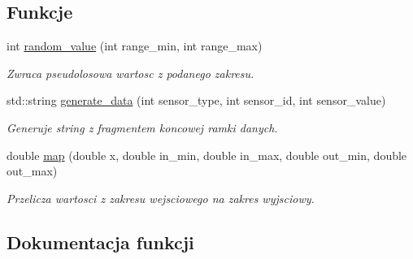 \subsection*{Funkcje}
\begin{DoxyCompactItemize}
\item 
int \hyperlink{functions_8hh_a134694e9ad39570ad22ae4d3ab15da30}{random\+\_\+value} (int range\+\_\+min, int range\+\_\+max)
\begin{DoxyCompactList}\small\item\em Zwraca pseudolosowa wartosc z podanego zakresu. \end{DoxyCompactList}\item 
std\+::string \hyperlink{functions_8hh_add18f5d9ace3ce376453930fc77a4a93}{generate\+\_\+data} (int sensor\+\_\+type, int sensor\+\_\+id, int sensor\+\_\+value)
\begin{DoxyCompactList}\small\item\em Generuje string z fragmentem koncowej ramki danych. \end{DoxyCompactList}\item 
double \hyperlink{functions_8hh_a7716aac0a1beea49c4bccf279c84a823}{map} (double x, double in\+\_\+min, double in\+\_\+max, double out\+\_\+min, double out\+\_\+max)
\begin{DoxyCompactList}\small\item\em Przelicza wartosci z zakresu wejsciowego na zakres wyjsciowy. \end{DoxyCompactList}\end{DoxyCompactItemize}


\subsection{Dokumentacja funkcji}

